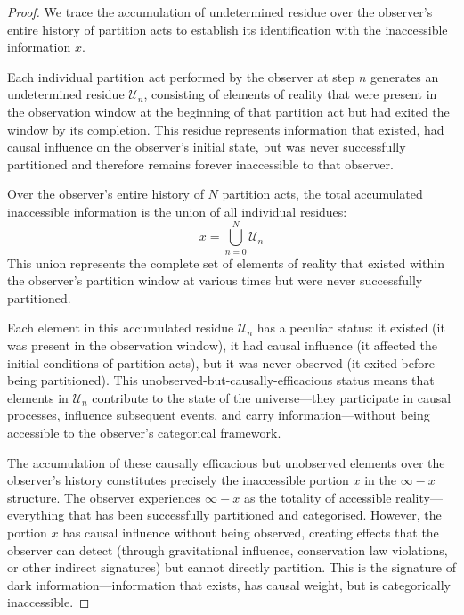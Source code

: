 \documentclass[12pt,a4paper]{article}
\theoremstyle{definition}
\theoremstyle{remark}
\begin{document}
\begin{proof}
We trace the accumulation of undetermined residue over the observer's entire history of partition acts to establish its identification with the inaccessible information $x$.

Each individual partition act performed by the observer at step $n$ generates an undetermined residue $\mathcal{U}_n$, consisting of elements of reality that were present in the observation window at the beginning of that partition act but had exited the window by its completion. This residue represents information that existed, had causal influence on the observer's initial state, but was never successfully partitioned and therefore remains forever inaccessible to that observer.

Over the observer's entire history of $N$ partition acts, the total accumulated inaccessible information is the union of all individual residues:
\begin{equation}
    x = \bigcup_{n=0}^{N} \mathcal{U}_n
\end{equation}
This union represents the complete set of elements of reality that existed within the observer's partition window at various times but were never successfully partitioned.

Each element in this accumulated residue $\mathcal{U}_n$ has a peculiar status: it existed (it was present in the observation window), it had causal influence (it affected the initial conditions of partition acts), but it was never observed (it exited before being partitioned). This unobserved-but-causally-efficacious status means that elements in $\mathcal{U}_n$ contribute to the state of the universe—they participate in causal processes, influence subsequent events, and carry information—without being accessible to the observer's categorical framework.

The accumulation of these causally efficacious but unobserved elements over the observer's history constitutes precisely the inaccessible portion $x$ in the $\infty - x$ structure. The observer experiences $\infty - x$ as the totality of accessible reality—everything that has been successfully partitioned and categorised. However, the portion $x$ has causal influence without being observed, creating effects that the observer can detect (through gravitational influence, conservation law violations, or other indirect signatures) but cannot directly partition. This is the signature of dark information—information that exists, has causal weight, but is categorically inaccessible.
\end{proof}
\end{document}
